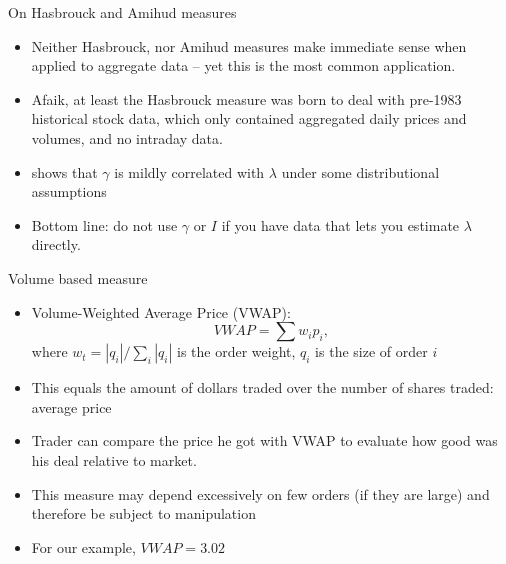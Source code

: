 \documentclass[english,10pt
,aspectratio=169
]{beamer}
\begin{document}
\begin{frame}{On Hasbrouck and Amihud measures}
\begin{itemize}
	\item Neither Hasbrouck, nor Amihud measures make immediate sense when applied to aggregate data -- yet this is the most common application.
	
	\item Afaik, at least the Hasbrouck measure was born to deal with pre-1983 historical stock data, which only contained aggregated daily prices and volumes, and no intraday data. 
	
	\item \cite{hasbrouck_empirical_2007} shows that $\gamma$ is mildly correlated with $\lambda$ under some distributional assumptions
	
	\item Bottom line: do not use $\gamma$ or $I$ if you have data that lets you estimate $\lambda$ directly.
\end{itemize}
\end{frame}


\begin{frame}{Volume based measure}
\begin{itemize}
	\item \alert{Volume-Weighted Average Price} (VWAP):
	\[
	VWAP = \sum  w_i p_i,
	\]
	where $w_t = |q_i|/\sum_i |q_i|$ is the order weight, $q_i$ is the size of order $i$
	\item This equals the amount of dollars traded over the number of shares traded: average price
	\item Trader can compare the price he got with VWAP to evaluate how good was his deal relative to market.
	\item This measure may depend excessively on few orders (if they are large) and therefore be subject to manipulation
	\item For our example, $VWAP=3.02$
\end{itemize}
\end{frame}
\end{document}
